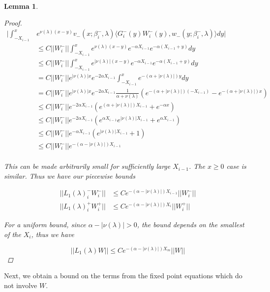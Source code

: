 \documentclass[12pt]{article}
\newtheorem{lemma}{Lemma}
\begin{document}
\begin{lemma}
\begin{proof}
\begin{align*}
\Big| \int_{-X_{i-1}}^x &e^{\nu(\lambda)(x-y)} v_-(x; \beta_i^-, \lambda) \langle G_i^-(y)W_i^-(y), w_-(y; \beta_i^-, \lambda) \rangle dy \Big| \\
&\leq C ||W_i^-|| \int_{-X_{i-1}}^x e^{\nu(\lambda)(x-y)} e^{-\alpha X_{i-1}}e^{-\alpha(X_{i-1} + y)}dy \\
&\leq C ||W_i^-|| \int_{-X_{i-1}}^x e^{|\nu(\lambda)| (x-y)} e^{-\alpha X_{i-1}}e^{-\alpha(X_{i-1} + y)}dy \\
&= C ||W_i^-|| e^{|\nu(\lambda)| x } e^{-2 \alpha X_{i-1}} \int_{-X_{i-1}}^x e^{-(\alpha + |\nu(\lambda)|) y} dy \\
&= C ||W_i^-|| e^{|\nu(\lambda)| x } e^{-2 \alpha X_{i-1}} \frac{1}{\alpha + \nu(\lambda)} \left( e^{-(\alpha + |\nu(\lambda)|)(-X_{i-1})} - e^{-(\alpha + |\nu(\lambda)|)x} \right) \\
&\leq C ||W_i^-|| e^{-2 \alpha X_{i-1}} \left( e^{(\alpha + |\nu(\lambda)|)X_{i-1}} + e^{-\alpha x}  \right) \\
&\leq C ||W_i^-|| e^{-2 \alpha X_{i-1}} \left( e^{\alpha X_{i-1}} e^{|\nu(\lambda)|X_{i-1}} + e^{\alpha X_{i-1}}  \right) \\
&\leq C ||W_i^-|| e^{-\alpha X_{i-1}} \left( e^{|\nu(\lambda)|X_{i-1}} + 1 \right) \\
&\leq C ||W_i^-|| e^{-(\alpha -|\nu(\lambda)|)X_{i-1}} \\
\end{align*}

This can be made arbitrarily small for sufficiently large $X_{i-1}$. The $x \geq 0$ case is similar. Thus we have our piecewise bounds

\begin{align*}
||L_1(\lambda)_i^- W_i^-|| &\leq C e^{-(\alpha -|\nu(\lambda)|)X_{i-1}} ||W_i^-|| \\
||L_1(\lambda)_i^+ W_i^+|| &\leq C e^{-(\alpha -|\nu(\lambda)|)X_i} ||W_i^+||
\end{align*}

For a uniform bound, since $\alpha -|\nu(\lambda)| > 0$, the bound depends on the smallest of the $X_i$, thus we have

\[
||L_1(\lambda)W|| \leq 
C e^{-(\alpha -|\nu(\lambda)|)X_m}||W||
\]

\end{proof}
\end{lemma}

Next, we obtain a bound on the terms from the fixed point equations which do not involve $W$. 
\end{document}
